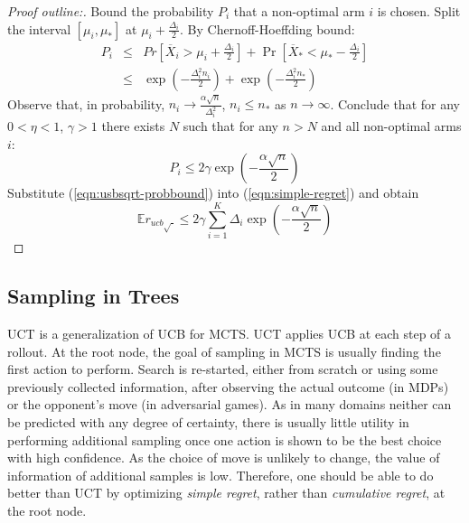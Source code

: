 \documentclass[letterpaper]{article}
\newcommand {\IE} {\ensuremath {\mathbb{E}}}
\begin{document}
\begin{proof}[Proof outline:] Bound the probability $P_i$ that a
  non-optimal arm $i$ is chosen. Split the interval $[\mu_i, \mu_*]$
  at $\mu_i+\frac {\Delta_i} 2$. By Chernoff-Hoeffding bound:
\begin{eqnarray}
P_i&\le&Pr\left[\overline X_i>\mu_i+\frac {\Delta_i} 2\right]+\Pr\left[\overline X_*<\mu_*-\frac {\Delta_i}
  2\right]\nonumber \\
   &\le&\exp\left(-\frac {\Delta_i^2n_i} 2\right)+\exp\left(-\frac {\Delta_i^2n_*} 2\right)
\end{eqnarray}
Observe that, in probability, $n_i\to \frac {\alpha \sqrt n}
{\Delta_i^2}$, $n_i\le n_*$ as $n\to\infty$. Conclude that for
any $0<\eta<1$, $\gamma>1$ there exists $N$ such that for any $n>N$ and
all non-optimal arms $i$:
\begin{equation}
P_i \le 2\gamma \exp\left(-\frac {\alpha \sqrt n} 2\right)
\label{eqn:usbsqrt-probbound}
\end{equation}
Substitute (\ref{eqn:usbsqrt-probbound}) into
(\ref{eqn:simple-regret}) and obtain
\begin{equation}
\IE r_{ucb\sqrt{\cdot}} \le 2\gamma\sum_{i=1}^K\Delta_i\exp\left(-\frac {\alpha\sqrt{n}} 2\right)
\end{equation}
\end{proof}

\subsection{Sampling in Trees}
\label{sec:sampling-in-trees}

UCT \cite{Kocsis.uct} is a generalization of UCB for MCTS.  UCT
applies UCB at each step of a rollout.  
At the root node, the goal of sampling in MCTS is usually finding the
first action to perform. Search is re-started, either from scratch or using some
previously collected information, after observing the actual outcome (in MDPs) or
the opponent's move (in adversarial games). As in many domains neither can be
predicted with any degree of certainty, there is usually little utility in performing additional
sampling once one action is shown to be the best choice with high confidence.
As the choice of move is unlikely to change, the value of information of additional samples
is low. Therefore, one should be able to do better than UCT by optimizing {\em simple regret},
rather than {\em cumulative regret},
at the root node.
\end{document}
